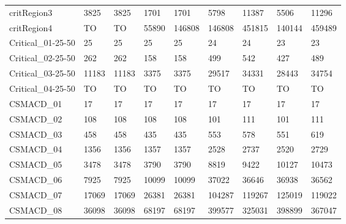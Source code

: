 \begin{table}
\begin{adjustbox}{max totalheight=\textheight}
\begin{tabular}{|l|llllllll|}
    critRegion3        & 3825              & 3825              & 1701              & 1701              & 5798     & 11387    & 5506     & 11296    \\
    critRegion4        & TO                & TO                & 55890             & 146808            & 146808   & 451815   & 140144   & 459489   \\ \hline
    Critical\_01-25-50 & 25                & 25                & 25                & 25                & 24       & 24       & 23       & 23       \\
    Critical\_02-25-50 & 262               & 262               & 158               & 158               & 499      & 542      & 427      & 489      \\
    Critical\_03-25-50 & 11183             & 11183             & 3375              & 3375              & 29517    & 34331    & 28443    & 34754    \\
    Critical\_04-25-50 & TO                & TO                & TO                & TO                & TO       & TO       & TO       & TO       \\ \hline
    CSMACD\_01         & 17                & 17                & 17                & 17                & 17       & 17       & 17       & 17       \\
    CSMACD\_02         & 108               & 108               & 108               & 108               & 101      & 111      & 101      & 111      \\
    CSMACD\_03         & 458               & 458               & 435               & 435               & 553      & 578      & 551      & 619      \\
    CSMACD\_04         & 1356              & 1356              & 1357              & 1357              & 2528     & 2737     & 2520     & 2729     \\
    CSMACD\_05         & 3478              & 3478              & 3790              & 3790              & 8819     & 9422     & 10127    & 10473    \\
    CSMACD\_06         & 7925              & 7925              & 10099             & 10099             & 37022    & 36646    & 36938    & 36562    \\
    CSMACD\_07         & 17069             & 17069             & 26381             & 26381             & 104287   & 119267   & 125019   & 119022   \\
    CSMACD\_08         & 36098             & 36098             & 68197             & 68197             & 399577   & 325031   & 398899   & 367047   \\ \hline

\end{tabular}
\end{adjustbox}
\end{table}
